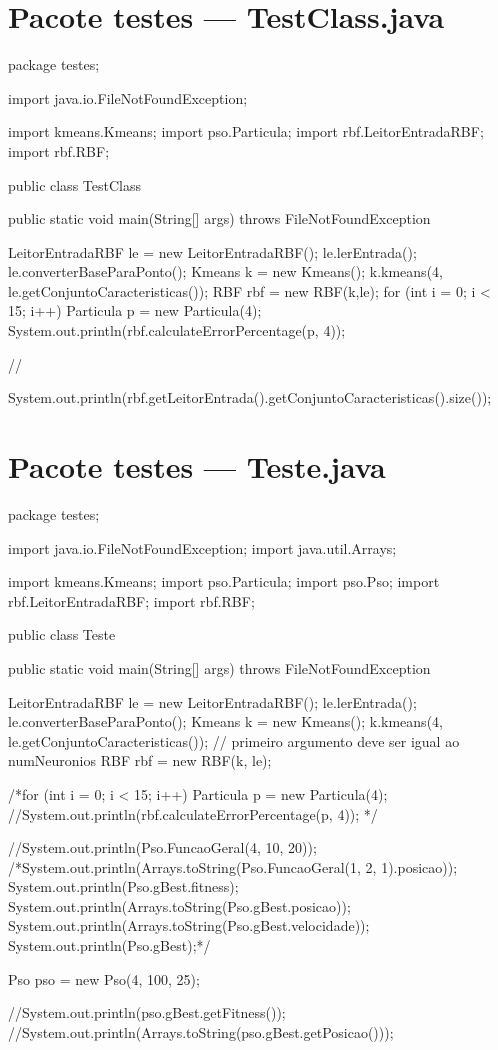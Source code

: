 \documentclass[10pt,twocolumn,letterpaper]{article}
\begin{document}
\section*{Pacote testes --- TestClass.java}

\begin{spverbatim}
package testes;

import java.io.FileNotFoundException;

import kmeans.Kmeans;
import pso.Particula;
import rbf.LeitorEntradaRBF;
import rbf.RBF;

public class TestClass {

	public static void main(String[] args) throws FileNotFoundException {
		LeitorEntradaRBF le = new LeitorEntradaRBF();
		le.lerEntrada();
		le.converterBaseParaPonto();
		Kmeans k = new Kmeans();
		k.kmeans(4, le.getConjuntoCaracteristicas());
		RBF rbf = new RBF(k,le);
		for (int i = 0; i < 15; i++) {
			Particula p = new Particula(4);
			System.out.println(rbf.calculateErrorPercentage(p, 4));
		}
		
		
//		
		
		
		System.out.println(rbf.getLeitorEntrada().getConjuntoCaracteristicas().size());

	}

}
\end{spverbatim}

\section*{Pacote testes --- Teste.java}

\begin{spverbatim}
package testes;

import java.io.FileNotFoundException;
import java.util.Arrays;

import kmeans.Kmeans;
import pso.Particula;
import pso.Pso;
import rbf.LeitorEntradaRBF;
import rbf.RBF;

public class Teste {

		public static void main(String[] args) throws FileNotFoundException {
			LeitorEntradaRBF le = new LeitorEntradaRBF();
			le.lerEntrada();
			le.converterBaseParaPonto();
			Kmeans k = new Kmeans();
			k.kmeans(4, le.getConjuntoCaracteristicas()); // primeiro argumento deve ser igual ao numNeuronios
			RBF rbf = new RBF(k, le);
			
			/*for (int i = 0; i < 15; i++) {
				Particula p = new Particula(4);
				//System.out.println(rbf.calculateErrorPercentage(p, 4));
			}*/
			
			//System.out.println(Pso.FuncaoGeral(4, 10, 20));
			/*System.out.println(Arrays.toString(Pso.FuncaoGeral(1, 2, 1).posicao));
			System.out.println(Pso.gBest.fitness);
			System.out.println(Arrays.toString(Pso.gBest.posicao));
			System.out.println(Arrays.toString(Pso.gBest.velocidade));
			System.out.println(Pso.gBest);*/
			
			Pso pso = new Pso(4, 100, 25);
			
			//System.out.println(pso.gBest.getFitness());
			//System.out.println(Arrays.toString(pso.gBest.getPosicao()));

		}

	}
\end{spverbatim}
\end{document}
